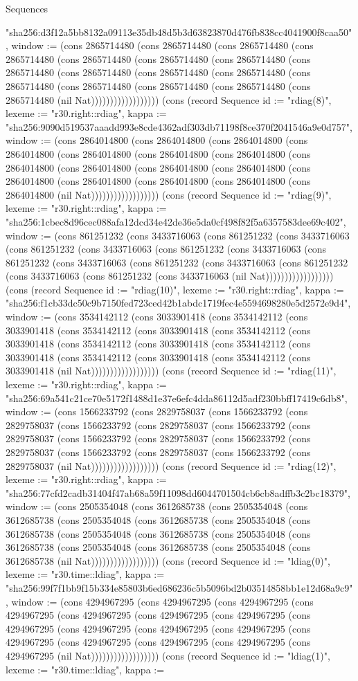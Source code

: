 \begin{lexlean}{Sequences}
\begin{semanticmodule}
{"sha256:d3f12a5bb8132a09113e35db48d5b3d63823870d476fb838cc4041900f8caa50", window := (cons 2865714480 (cons 2865714480 (cons 2865714480 (cons 2865714480 (cons 2865714480 (cons 2865714480 (cons 2865714480 (cons 2865714480 (cons 2865714480 (cons 2865714480 (cons 2865714480 (cons 2865714480 (cons 2865714480 (cons 2865714480 (cons 2865714480 (cons 2865714480 (nil Nat)))))))))))))))))}) (cons (record Sequence {id := "rdiag(8)", lexeme := "r30.right::rdiag", kappa := "sha256:9090d519537aaadd993e8cde4362adf303db71198f8ce370f2041546a9e0d757", window := (cons 2864014800 (cons 2864014800 (cons 2864014800 (cons 2864014800 (cons 2864014800 (cons 2864014800 (cons 2864014800 (cons 2864014800 (cons 2864014800 (cons 2864014800 (cons 2864014800 (cons 2864014800 (cons 2864014800 (cons 2864014800 (cons 2864014800 (cons 2864014800 (nil Nat)))))))))))))))))}) (cons (record Sequence {id := "rdiag(9)", lexeme := "r30.right::rdiag", kappa := "sha256:1cbec8d96cec088afa12dcd34e42de36e5da0cf498f82f5a6357583dee69c402", window := (cons 861251232 (cons 3433716063 (cons 861251232 (cons 3433716063 (cons 861251232 (cons 3433716063 (cons 861251232 (cons 3433716063 (cons 861251232 (cons 3433716063 (cons 861251232 (cons 3433716063 (cons 861251232 (cons 3433716063 (cons 861251232 (cons 3433716063 (nil Nat)))))))))))))))))}) (cons (record Sequence {id := "rdiag(10)", lexeme := "r30.right::rdiag", kappa := "sha256:f1cb33dc50c9b7150fed723ced42b1abdc1719fec4e5594698280e5d2572e9d4", window := (cons 3534142112 (cons 3033901418 (cons 3534142112 (cons 3033901418 (cons 3534142112 (cons 3033901418 (cons 3534142112 (cons 3033901418 (cons 3534142112 (cons 3033901418 (cons 3534142112 (cons 3033901418 (cons 3534142112 (cons 3033901418 (cons 3534142112 (cons 3033901418 (nil Nat)))))))))))))))))}) (cons (record Sequence {id := "rdiag(11)", lexeme := "r30.right::rdiag", kappa := "sha256:69a541c21ce70e5172f1488d1e37e6efc4dda86112d5adf230bbff17419c6db8", window := (cons 1566233792 (cons 2829758037 (cons 1566233792 (cons 2829758037 (cons 1566233792 (cons 2829758037 (cons 1566233792 (cons 2829758037 (cons 1566233792 (cons 2829758037 (cons 1566233792 (cons 2829758037 (cons 1566233792 (cons 2829758037 (cons 1566233792 (cons 2829758037 (nil Nat)))))))))))))))))}) (cons (record Sequence {id := "rdiag(12)", lexeme := "r30.right::rdiag", kappa := "sha256:77cfd2cadb31404f47ab68a59f11098dd6044701504cb6cb8adffb3c2bc18379", window := (cons 2505354048 (cons 3612685738 (cons 2505354048 (cons 3612685738 (cons 2505354048 (cons 3612685738 (cons 2505354048 (cons 3612685738 (cons 2505354048 (cons 3612685738 (cons 2505354048 (cons 3612685738 (cons 2505354048 (cons 3612685738 (cons 2505354048 (cons 3612685738 (nil Nat)))))))))))))))))}) (cons (record Sequence {id := "ldiag(0)", lexeme := "r30.time::ldiag", kappa := "sha256:99f7f1bb9f15b334e85803b6ed686236c5b5096bd2b03514858bb1e12d68a9c9", window := (cons 4294967295 (cons 4294967295 (cons 4294967295 (cons 4294967295 (cons 4294967295 (cons 4294967295 (cons 4294967295 (cons 4294967295 (cons 4294967295 (cons 4294967295 (cons 4294967295 (cons 4294967295 (cons 4294967295 (cons 4294967295 (cons 4294967295 (cons 4294967295 (nil Nat)))))))))))))))))}) (cons (record Sequence {id := "ldiag(1)", lexeme := "r30.time::ldiag", kappa := }
\end{semanticmodule}
\end{lexlean}
